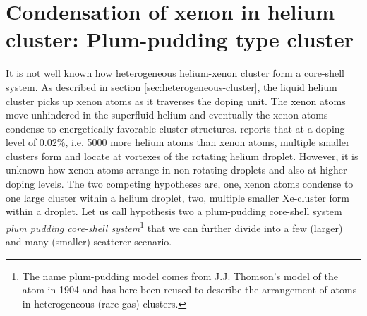 \section{Condensation of xenon in helium cluster: Plum-pudding type cluster}\label{sec:helium-data}
It is not well known how heterogeneous helium-xenon cluster form a core-shell system. As described in section \ref{sec:heterogeneous-cluster}, the liquid helium cluster picks up xenon atoms as it traverses the doping unit. The xenon atoms move unhindered in the superfluid helium and eventually the xenon atoms condense to energetically favorable cluster structures. \citep{Gomez-2014-Science} reports that at a doping level of $0.02\%$, i.e. 5000 more helium atoms than xenon atoms, multiple smaller clusters form and locate at vortexes of the rotating helium droplet. However, it is unknown how xenon atoms arrange in non-rotating droplets and also at higher doping levels. The two competing hypotheses are, one, xenon atoms condense to one large cluster within a helium droplet, two, multiple smaller Xe-cluster form within a droplet. Let us call hypothesis two a plum-pudding core-shell system \textit{plum pudding core-shell system}\footnote{The name plum-pudding model comes from J.J. Thomson's model of the atom in 1904 and has here been reused to describe the arrangement of atoms in heterogeneous (rare-gas) clusters.} that we can further divide into a few (larger) and many (smaller) scatterer scenario.\\
